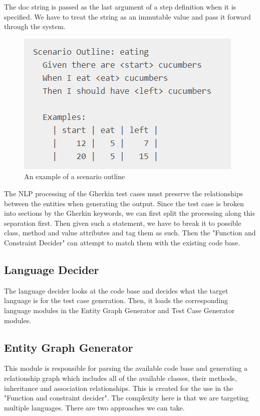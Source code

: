 \documentclass[conference]{IEEEtran}
\begin{document}
\begin{itemize}
	The doc string is passed as the last argument of a step definition when it is specified. We have to treat the string as an immutable value and pass it forward through the system.
	\begin{figure}
		\includegraphics[width=\linewidth]{Scenario_outline.png}
		\caption{An example of a scenario outline}
		\label{fig13}
	\end{figure}
\end{itemize}

The NLP processing of the Gherkin test cases must preserve the relationships between the entities when generating the output. Since the test case is broken into sections by the Gherkin keywords, we can first split the processing along this separation first. Then given such a statement, we have to break it to possible class, method and value attributes and tag them as such. Then the "Function and Constraint Decider" can attempt to match them  with the existing code base.
 \subsection{Language Decider}
The language decider looks at the code base and decides what the target language is for the test case generation. Then, it loads the corresponding language modules in the Entity Graph Generator and Test Case Generator modules.
 
\subsection{Entity Graph Generator}
This module is responsible for parsing the available code base and generating a relationship graph which includes all of the available classes, their methods, inheritance and association relationships. This is created for the use in the "Function and constraint decider". The complexity here is that we are targeting multiple languages. There are two approaches we can take.
\end{document}
